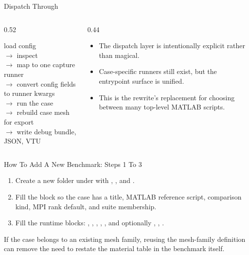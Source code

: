 \documentclass[aspectratio=169,10pt]{beamer}
\begin{document}
\begin{frame}{Dispatch Through }
\small
\begin{columns}[T,totalwidth=\textwidth]
\begin{column}{0.52\textwidth}
\begin{pseudobox}
load config\\
$\rightarrow$ inspect \\
$\rightarrow$ map to one capture runner\\
$\rightarrow$ convert config fields to runner kwargs\\
$\rightarrow$ run the case\\
$\rightarrow$ rebuild case mesh for export\\
$\rightarrow$ write debug bundle, JSON, VTU
\end{pseudobox}
\end{column}
\begin{column}{0.44\textwidth}
\begin{softbox}
\begin{itemize}
  \item The dispatch layer is intentionally explicit rather than magical.
  \item Case-specific runners still exist, but the entrypoint surface is unified.
  \item This is the rewrite's replacement for choosing between many top-level MATLAB scripts.
\end{itemize}
\end{softbox}
\end{column}
\end{columns}
\end{frame}

\begin{frame}{How To Add A New Benchmark: Steps 1 To 3}
\small
\begin{enumerate}
  \item Create a new folder under  with , , and .
  \item Fill the \code{[benchmark]} block so the case has a title, MATLAB reference script, comparison kind, MPI rank default, and suite membership.
  \item Fill the runtime blocks: \code{[problem]}, \code{[execution]}, \code{[continuation]}, \code{[newton]}, , and optionally \code{[seepage]}, \code{[export]}, \code{[[materials]]}.
\end{enumerate}
\vspace{0.18cm}
\begin{callout}
If the case belongs to an existing mesh family, reusing the mesh-family definition can remove the need to restate the material table in the benchmark itself.
\end{callout}
\end{frame}
\end{document}

